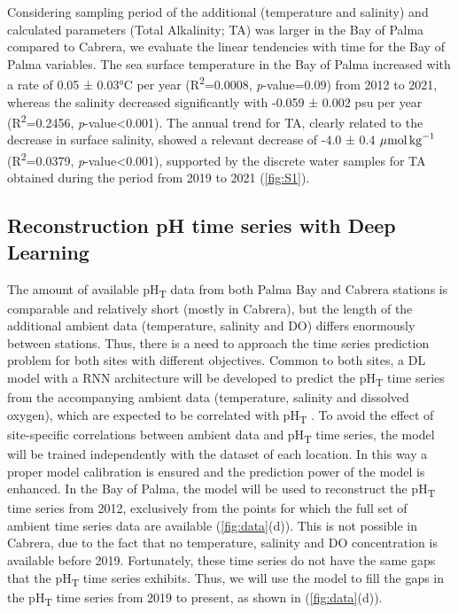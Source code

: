 Considering sampling period of the additional (temperature and salinity)
and calculated parameters (Total Alkalinity; TA) was larger in the Bay of Palma
compared to Cabrera, we evaluate the linear tendencies with time for the Bay of
Palma variables. The sea surface temperature in the Bay of Palma increased with
a rate of 0.05 ± 0.03°C per year (R\textsuperscript{2}=0.0008,
\emph{p}-value=0.09) from 2012 to 2021, whereas the salinity decreased
significantly with -0.059 ± 0.002 psu per year (R\textsuperscript{2}=0.2456,
\emph{p}-value<0.001). The annual trend for TA, clearly related to the decrease
in surface salinity, showed a relevant decrease of -4.0 ± 0.4 ${\mu
            \textrm{mol\,kg}^{-1}}$ (R\textsuperscript{2}=0.0379,
\emph{p}-value<0.001),
supported by the discrete water samples for TA obtained during the period from
2019 to 2021  (\cref{fig:S1}).

\subsection{Reconstruction pH time series with Deep Learning}

The amount of available pH\textsubscript{T} data from both Palma Bay and
Cabrera stations is comparable and relatively short (mostly in Cabrera), but
the length of the additional ambient data (temperature, salinity and DO)
differs enormously between stations. Thus, there is a need to approach the time
series prediction problem for both sites with different objectives. Common to
both sites, a DL model with a RNN architecture will be developed to predict the
pH\textsubscript{T} time series from the accompanying ambient data
(temperature, salinity and dissolved oxygen), which are expected to be
correlated with pH\textsubscript{T} \cite{Fourrier2020,Broullon2021}. To avoid
the effect of site-specific correlations between ambient data and
pH\textsubscript{T} time series, the model will be trained independently with
the dataset of each location. In this way a proper model calibration is ensured
and the prediction power of the model is enhanced. In the Bay of Palma, the
model will be used to reconstruct the pH\textsubscript{T} time series from
2012, exclusively from the points for which the full set of ambient time series
data are available (\cref{fig:data}(d)). This is not possible in Cabrera, due
to the fact that no temperature, salinity and DO concentration is available
before 2019. Fortunately, these time series do not have the same gaps that the
pH\textsubscript{T} time series exhibits. Thus, we will use the model to fill
the gaps in the pH\textsubscript{T} time series from 2019 to present, as shown
in (\cref{fig:data}(d)).

